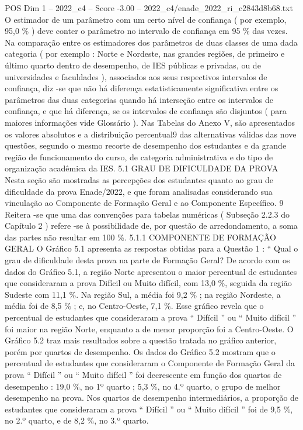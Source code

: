 \begin{textsample}{POS Dim 1 – 2022\_c4 – Score -3.00 – 2022\_c4/enade\_2022\_ri\_c2843d8b68.txt}
O estimador de um parâmetro com um certo nível de confiança ( por exemplo, 95,0 \% ) deve conter o parâmetro no intervalo de confiança em 95 \% das vezes.
Na comparação entre os estimadores dos parâmetros de duas classes de uma dada categoria ( por exemplo : Norte e Nordeste, nas grandes regiões, de primeiro e último quarto dentro de desempenho, de IES públicas e privadas, ou de universidades e faculdades ), associados aos seus respectivos intervalos de confiança, diz -se que não há diferença estatisticamente significativa entre os parâmetros das duas categorias quando há interseção entre os intervalos de confiança, e que há diferença, se os intervalos de confiança são disjuntos ( para maiores informações vide Glossário ).
Nas Tabelas do Anexo V, são apresentados os valores absolutos e a distribuição percentual9 das alternativas válidas das nove questões, segundo o mesmo recorte de desempenho dos estudantes e da grande região de funcionamento do curso, de categoria administrativa e do tipo de organização acadêmica da IES. 5.1 GRAU DE DIFICULDADE DA PROVA Nesta seção são mostradas as percepções dos estudantes quanto ao grau de dificuldade da prova Enade/2022, e que foram analisadas considerando sua vinculação ao Componente de Formação Geral e ao Componente Específico. 9 Reitera -se que uma das convenções para tabelas numéricas ( Subseção 2.2.3 do Capítulo 2 ) refere -se à possibilidade de, por questão de arredondamento, a soma das partes não resultar em 100 \%. 5.1.1 COMPONENTE DE FORMAÇÃO GERAL O Gráfico 5.1 apresenta as respostas obtidas para a Questão 1 : “ Qual o grau de dificuldade desta prova na parte de Formação Geral?
De acordo com os dados do Gráfico 5.1, a região Norte apresentou o maior percentual de estudantes que consideraram a prova Difícil ou Muito difícil, com 13,0 \%, seguida da região Sudeste com 11,1 \%.
Na região Sul, a média foi 9,2 \% ; na região Nordeste, a média foi de 8,5 \% ; e, no Centro-Oeste, 7,1 \%.
Esse gráfico revela que o percentual de estudantes que consideraram a prova “ Difícil ” ou “ Muito difícil ” foi maior na região Norte, enquanto a de menor proporção foi a Centro-Oeste.
O Gráfico 5.2 traz mais resultados sobre a questão tratada no gráfico anterior, porém por quartos de desempenho.
Os dados do Gráfico 5.2 mostram que o percentual de estudantes que consideraram o Componente de Formação Geral da prova “ Difícil ” ou “ Muito difícil ” foi decrescente em função dos quartos de desempenho : 19,0 \%, no 1º quarto ; 5,3 \%, no 4.º quarto, o grupo de melhor desempenho na prova.
Nos quartos de desempenho intermediários, a proporção de estudantes que consideraram a prova “ Difícil ” ou “ Muito difícil ” foi de 9,5 \%, no 2.º quarto, e de 8,2 \%, no 3.º quarto.

\end{textsample}

